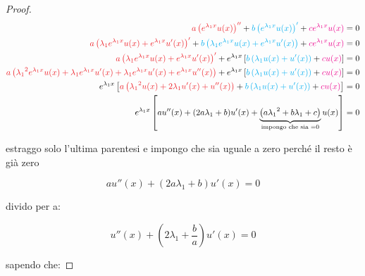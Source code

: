 \begin{proof}
    \begin{align*}
        \textcolor{Red}{a\left( e^{\lambda_{1}x}u(x) \right)''} + \textcolor{Cyan}{b\left( e^{\lambda_{1}x}u(x) \right)'} + \textcolor{Magenta}{ce^{\lambda_{1}x}u(x)}                                                                                                                                 & =0  \\
        \textcolor{Red}{a\left( \lambda_{1}e^{\lambda_{1}x}u(x)+ e^{\lambda_{1}x}u'(x) \right)'} + \textcolor{Cyan}{b\left( \lambda_1e^{\lambda_{1}x}u(x) + e^{\lambda_{1}x}u'(x) \right)} + \textcolor{Magenta}{ce^{\lambda_{1}x}u(x)}                                                                & =0  \\
        \textcolor{Red}{a\left( \lambda_{1}e^{\lambda_{1}x}u(x)+ e^{\lambda_{1}x}u'(x) \right)'} + e^{\lambda_{1}x} \left[ \textcolor{Cyan}{b\left( \lambda_{1}u(x) + u'(x) \right)} + \textcolor{Magenta}{cu(x)} \right]                                                                              & =0  \\
        \textcolor{Red}{a\left( {\lambda_{1}}^{2}e^{\lambda_{1}x}u(x) + \lambda_{1}e^{\lambda_{1}x}u'(x) + \lambda_{1}e^{\lambda_{1}x}u'(x) + e^{\lambda_{1}x}u''(x) \right)} + e^{\lambda_{1}x} \left[ \textcolor{Cyan}{b\left( \lambda_{1}u(x) + u'(x) \right)} + \textcolor{Magenta}{cu(x)} \right] & =0  \\
        e^{\lambda_{1}x} \left[ \textcolor{Red}{a\left( {\lambda_{1}}^{2}u(x) + 2\lambda_{1}u'(x) + u''(x) \right)} + \textcolor{Cyan}{b\left( \lambda_1u(x) + u'(x) \right)} + \textcolor{Magenta}{cu(x)} \right]                                                                                     & = 0 \\
        e^{\lambda_{1}x} \left[ au''(x) + (2a\lambda_{1} + b)u'(x) + \underbrace{\left(a{\lambda_{1}}^{2} + b\lambda_{1} + c\right)}_\text{impongo che sia =0}u(x) \right]                                                                                                                             & = 0
    \end{align*}

    estraggo solo l'ultima parentesi e impongo che sia uguale a zero perché il resto è già zero

    \[
        au''(x) + (2a \lambda_1 + b) u'(x) = 0
    \]

    divido per a:

    \[
        u''(x) +\left( 2 \lambda_1 + \frac{b}{a} \right) u'(x) = 0
    \]

    sapendo che:


\end{proof}
